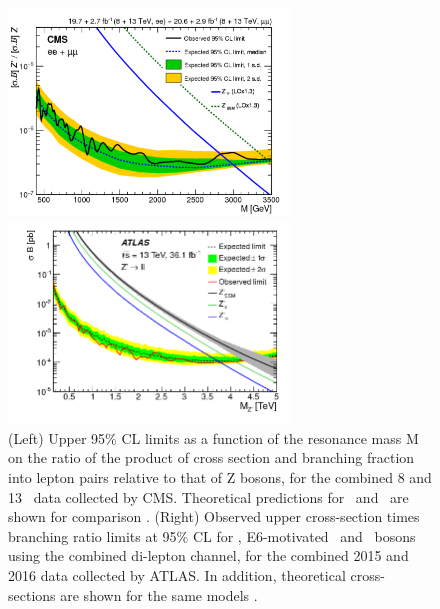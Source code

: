 \begin{itemize}
\begin{figure}[ht]
\begin{minipage}[b]{0.4\linewidth} %
\centering
\includegraphics[width=7.5cm]{figuras/Chapter1/CMSZprime2dileptonRun2Run12}
\end{minipage}
\hspace{0.5cm} %
\begin{minipage}[b]{0.6\linewidth}
\centering
\includegraphics[width=7.5cm]{figuras/Chapter1/ATLASZprime2dilepton.png}
\end{minipage}
\caption{(Left) Upper 95$\%$ CL limits as a function of the resonance mass 
M on the ratio of the product of cross section and branching fraction into 
lepton pairs relative to that of Z bosons, for the combined 8 and 13 \TeV~data collected by CMS. Theoretical 
predictions for \ZprimeSSM~and \Zprimepsi~are shown for comparison \cite{CMSZprimetodileptonrun1run2}. (Right) Observed upper cross-section 
times branching ratio limits at 95$\%$ CL for \Zprime, E6-motivated \Zprimepsi~and \Zprimechi~bosons
using the combined di-lepton channel, for the combined 2015 and 2016 data collected by ATLAS. 
In addition, theoretical cross-sections are shown for the same models \cite{ATLASZprimetodileptonrun2}.} \label{CMSATLASdileptonresult}
\end{figure}


\end{itemize}
